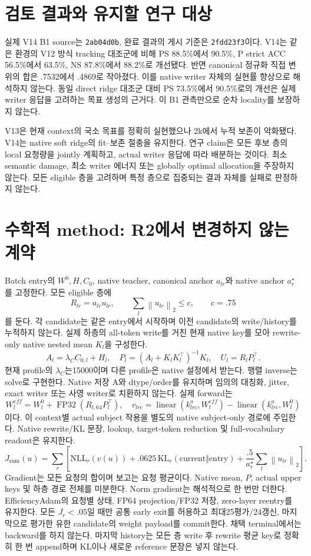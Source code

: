 \documentclass[11pt]{article}
\newcommand{\norm}[1]{\left\lVert #1\right\rVert}
\begin{document}
\section{검토 결과와 유지할 연구 대상}
실제 V14 B1 source는 \texttt{2ab04d0b}, 완료 결과의 게시 기준은
\texttt{2fdd23f3}이다. V14는 같은 환경의 V12 방식 tracking 대조군에 비해
PS 88.5\%에서 90.5\%, P strict ACC 56.5\%에서 63.5\%, NS 87.8\%에서
88.2\%로 개선됐다. 반면 canonical 정규화 직접 변위의 합은 .7532에서 .4869로
작아졌다. 이를 native writer 자체의 실현률 향상으로 해석하지 않는다.
동일 direct ridge 대조군 대비 PS 73.5\%에서 90.5\%로의 개선은 실제 writer 응답을
고려하는 목표 생성의 근거다. 이 B1 관측만으로 순차 locality를 보장하지 않는다.

V13은 현재 context의 국소 목표를 정확히 실현했으나 2k에서 누적 보존이 악화됐다.
V14는 native soft ridge의 fit--보존 절충을 유지한다. 연구 claim은 모든 후보 층의
local 요청량을 jointly 계획하고, actual writer 응답에 따라 배분하는 것이다.
최소 semantic damage, 최소 writer 에너지 또는 globally optimal allocation을 주장하지 않는다.
모든 eligible 층을 고려하며 특정 층으로 집중되는 결과 자체를 실패로 판정하지 않는다.

\section{수학적 method: R2에서 변경하지 않는 계약}
Batch entry의 $W^0,H,C_0$, native teacher, canonical anchor $a_{lr}$와
native anchor $a_r^\star$를 고정한다. 모든 eligible 층에
\[
 R_{lr}=a_{lr}u_{lr},\qquad
 \sum_l\norm{u_{lr}}_2\le c,\qquad c=.75
\]
를 둔다. 각 candidate는 같은 entry에서 시작하며 이전 candidate의 write/history를
누적하지 않는다. 실제 하층의 all-token write를 거친 현재 native key를 모아
rewrite-only native nested mean $K_l$을 구성한다.
\[
 A_l=\lambda_C C_{0,l}+H_l,\quad
 P_l=(A_l+K_lK_l^\top)^{-1}K_l,\quad U_l=R_lP_l^\top.
\]
현재 profile의 $\lambda_C$는15000이며 다른 profile은 native 설정에서 받는다.
행렬 inverse는 solve로 구현한다. Native 저장 A와 dtype/order를 유지하며 임의의
대칭화, jitter, exact writer 또는 사영 writer로 치환하지 않는다.
실제 forward는
\[
 W_l^{eff}=W_l^0+\operatorname{FP32}(R_{l,64}P_l^\top),\quad
 v_{lrc}=\operatorname{linear}(k^a_{lrc},W_l^{eff})
          -\operatorname{linear}(k^a_{lrc},W_l^0)
\]
이다. 이 context별 actual subject 작용을 별도의 native subject-only 경로에 주입한다.
Native rewrite/KL 문장, lookup, target-token reduction 및 full-vocabulary readout은 유지한다.
\[
 J_{\mathrm{sum}}(u)=\sum_r\left[
 \mathrm{NLL}_r(v(u))+.0625\,\mathrm{KL}_r(\mathrm{current}\Vert\mathrm{entry})
 +\frac{.5}{a_r^\star}\sum_l\norm{u_{lr}}_2\right].
\]
Gradient는 모든 요청의 합이며 보고는 요청 평균이다. Native mean, $P$, actual upper
keys 및 하층 경로 전체를 미분한다. Norm gradient는 해석적으로 한 번만 더한다.
EfficiencyAdam의 요청별 상태, FP64 projection/FP32 저장, zero-layer reentry를 유지한다.
모든 $J_r<.05$일 때만 공통 early exit를 허용하고 최대25평가/24갱신,
마지막으로 평가한 유한 candidate의 weight payload를 commit한다. 채택 terminal에서는
backward를 하지 않는다. 마지막 history는 모든 층 write 후 rewrite 평균 key로 정확히 한 번
append하며 KL이나 새로운 reference 문장은 넣지 않는다.
\end{document}

